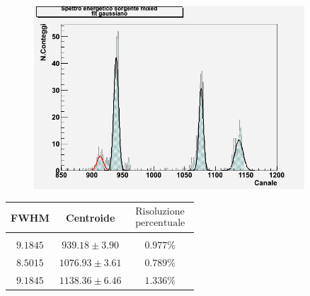 \begin{esempio}
   \vspace{0.3cm}

   \begin{minipage}{0.5\textwidth}
      \begin{figure}[H]
         \centering
         \includegraphics[width=0.9\textwidth]{immagini/spettro_alpha_riv_silicio_fit_gaussiano.png}
      \end{figure}
   \end{minipage}
   \begin{minipage}{0.495\textwidth}
      \centering
      \begin{tabular}{c|c|c}
      FWHM & Centroide & $\begin{array}{c}
         \text{Risoluzione}\\
         \text{percentuale}
      \end{array}$\\[0.4cm]
      \hline
      &&\\[-0.3cm]
      $9.1845$ & $939.18 \pm 3.90$ & $0.977\%$\\[0.1cm]
      $8.5015$ & $1076.93 \pm 3.61$ & $0.789\%$\\[0.1cm]
      $9.1845$ & $1138.36 \pm 6.46$ & $1.336\%$\\[0.1cm]
      \end{tabular}
   \end{minipage}
\end{esempio}


